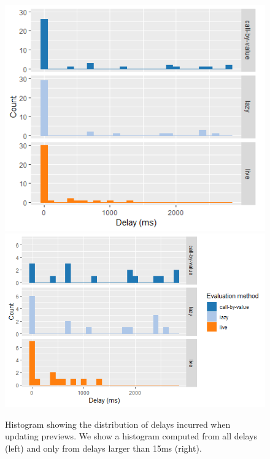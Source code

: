 \documentclass[english,submission]{programming}
\theoremstyle{plain}
\theoremstyle{definition}
\begin{document}
\begin{figure}
\vspace{-0.5em}
\noindent
\includegraphics[scale=0.48]{figures/hist-all.png}
\includegraphics[scale=0.48]{figures/hist-slow.png}
\vspace{-0.25em}
\caption{Histogram showing the distribution of delays incurred when updating previews.
  We show a histogram computed from all delays (left) and only from delays larger
  than 15ms (right).}
\label{fig:drawing-hist}
\vspace{-0.75em}
\end{figure}

\end{document}
